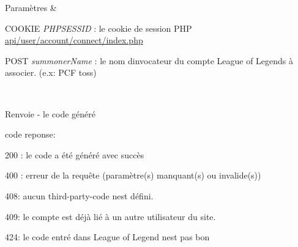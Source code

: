 \begin{DoxyParams}{Paramètres}
{\em } & 
\begin{DoxyItemize}
\item C\+O\+O\+K\+IE {\itshape P\+H\+P\+S\+E\+S\+S\+ID} \+: le cookie de session P\+HP \hyperlink{account_2connect_2index_8php}{api/user/account/connect/index.\+php}
\item P\+O\+ST {\itshape summoner\+Name} \+: le nom d\textquotesingle{}invocateur du compte League of Legends à associer. (e.\+x\+: \textquotesingle{}P\+CF toss\textquotesingle{}) 
\end{DoxyItemize}\\
\hline
\end{DoxyParams}
\begin{DoxyReturn}{Renvoie}
-\/ le code généré
\begin{DoxyItemize}
\item code reponse\+:
\item 200 \+: le code a été généré avec succès
\item 400 \+: erreur de la requête (paramètre(s) manquant(s) ou invalide(s))
\item 408\+: aucun third-\/party-\/code n\textquotesingle{}est défini.
\item 409\+: le compte est déjà lié à un autre utilisateur du site.
\item 424\+: le code entré dans League of Legend n\textquotesingle{}est pas bon 
\end{DoxyItemize}
\end{DoxyReturn}

